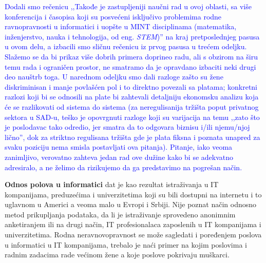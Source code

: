 \documentclass[a4paper]{report}
\newcommand{\odgovor}[1]{\textcolor{blue}{#1}}
\begin{document}
\odgovor{Dodali smo rečenicu ,,Takođe je zastupljeniji naučni rad u ovoj oblasti, sa više konferencija i časopisa koji su posvećeni isključivo problemima rodne ravnopravnosti u informatici i uopšte u MINT disciplinama (matematika, inženjerstvo, nauka i tehnologija, od eng. \emph{STEM})'' na kraj pretposlednjeg pasusa u ovom delu, a izbacili smo sličnu rečenicu iz prvog pasusa u trećem odeljku. Slažemo se da bi prikaz više dobrih primera doprineo radu, ali s obzirom na širu temu rada i ograničen prostor, ne smatramo da je opravdano izbaciti neki drugi deo nauštrb toga. U narednom odeljku smo dali razloge zašto su žene diskriminisan i manje povlašćen pol i to direktno povezali sa platama; konkretni razlozi koji bi se odnosili na plate bi zahtevali detaljniju ekonomsku analizu koja će se razlikovati od sistema do sistema (za neregulisanija tržišta poput privatnog sektora u SAD-u, teško je opovrgnuti razloge koji su varijacija na temu ,,zato što je poslodavac tako odredio, jer smatra da to odgovara biznisu i/ili njemu/njoj lično'', dok za striktno regulisana tržišta gde je plata fiksna i poznata unapred za svaku poziciju nema smisla postavljati ova pitanja). Pitanje, iako veoma zanimljivo, verovatno zahteva jedan rad ove dužine kako bi se adekvatno adresiralo, a ne želimo da rizikujemo da ga predstavimo na pogrešan način.}

\textbf{Odnos polova u informatici} dat je kao rezultat istraživanja u IT kompanijama, preduzećima i univerzitetima koji su bili dostupni na internetu i to uglavnom u Americi a veoma malo u Evropi i Srbiji. Nije poznat način odnosno metod prikupljanja podataka, da li je istraživanje sprovedeno anonimnim anketiranjem ili na drugi način, IT profesionalaca zaposlenih u IT kompanijama i univerzitetima. Rodna neravnovopravnost se može sagledati i poređenjem poslova u informatici u IT kompanijama, trebalo je naći primer na kojim poslovima i radnim zadacima rade većinom žene a koje poslove pokrivaju muškarci.
\end{document}
